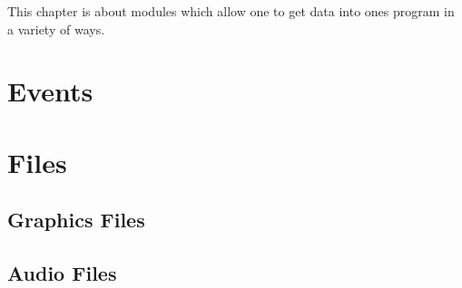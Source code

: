 %
% 
% 
\def\FileCreated{Sat Jun 23 02:24:49 2001}
\def\FileRevised{Sun Jun 24 19:38:51 2001}

This chapter is about modules which allow one to get data into ones
program in a variety of ways.

\section{Events}
\section{Files}
\subsection{Graphics Files}
\subsection{Audio Files}
